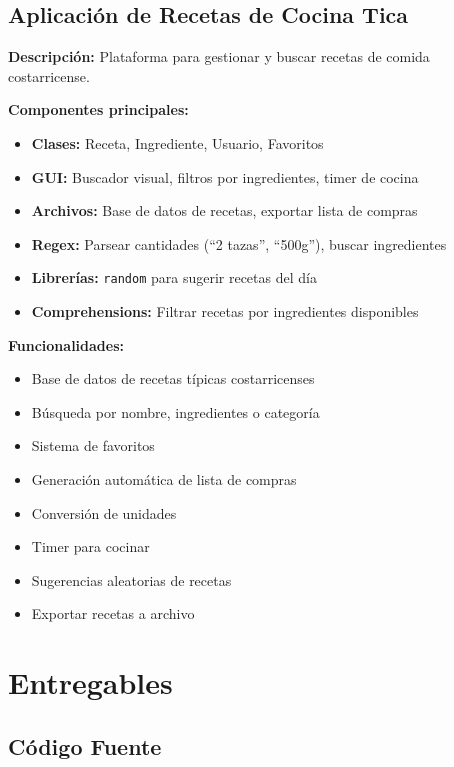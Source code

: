\documentclass[12pt,a4paper]{article}
\begin{document}
\subsection{Aplicación de Recetas de Cocina Tica}

\textbf{Descripción:} Plataforma para gestionar y buscar recetas de comida costarricense.

\vspace{0.5em}
\textbf{Componentes principales:}
\begin{itemize}
    \item \textbf{Clases:} Receta, Ingrediente, Usuario, Favoritos
    \item \textbf{GUI:} Buscador visual, filtros por ingredientes, timer de cocina
    \item \textbf{Archivos:} Base de datos de recetas, exportar lista de compras
    \item \textbf{Regex:} Parsear cantidades (``2 tazas'', ``500g''), buscar ingredientes
    \item \textbf{Librerías:} \texttt{random} para sugerir recetas del día
    \item \textbf{Comprehensions:} Filtrar recetas por ingredientes disponibles
\end{itemize}

\vspace{0.5em}
\textbf{Funcionalidades:}
\begin{itemize}
    \item Base de datos de recetas típicas costarricenses
    \item Búsqueda por nombre, ingredientes o categoría
    \item Sistema de favoritos
    \item Generación automática de lista de compras
    \item Conversión de unidades
    \item Timer para cocinar
    \item Sugerencias aleatorias de recetas
    \item Exportar recetas a archivo
\end{itemize}

\section{Entregables}

\subsection{Código Fuente}
\end{document}
